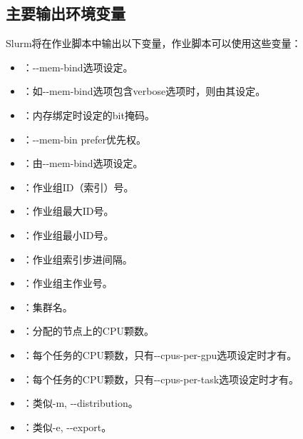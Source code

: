 \subsection{主要输出环境变量}
Slurm将在作业脚本中输出以下变量，作业脚本可以使用这些变量：
\begin{itemize}
      \item {}：-{}-mem-bind选项设定。
      \item {}：如-{}-mem-bind选项包含verbose选项时，则由其设定。
      \item {}：内存绑定时设定的bit掩码。
	  \item {}：-{}-mem-bin prefer优先权。
      \item {}：由-{}-mem-bind选项设定。
      \item {}：作业组ID（索引）号。
      \item {}：作业组最大ID号。
      \item {}：作业组最小ID号。
      \item {}：作业组索引步进间隔。
      \item {}：作业组主作业号。
      \item {}：集群名。
      \item {}：分配的节点上的CPU颗数。
      \item {}：每个任务的CPU颗数，只有-{}-cpus-per-gpu选项设定时才有。
      \item {}：每个任务的CPU颗数，只有-{}-cpus-per-task选项设定时才有。
      \item {}：类似-m, -{}-distribution。
	  \item {}：类似-e, -{}-export。

\end{itemize}
